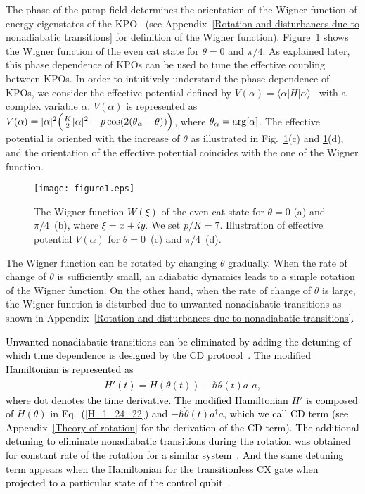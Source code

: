 \documentclass[%
 reprint,
 amsmath,amssymb,
 aps,
pra,
]{revtex4-2}
\begin{document}
The phase of the pump field determines the orientation of the Wigner function of energy eigenstates of the KPO~\cite{Puri2020} (see Appendix~\ref{Rotation and disturbances due to nonadiabatic transitions} for definition of the Wigner function).
Figure~\ref{Wig0_11_25_21} shows the Wigner function of the even cat state for $\theta=0$ and $\pi/4$.
As explained later, this phase dependence of KPOs can be used to tune the effective coupling between KPOs.
In order to intuitively understand the phase dependence of KPOs, we consider the effective potential defined by $V(\alpha)=\langle \alpha | H | \alpha \rangle$~\cite{Zhang2017} with a complex variable $\alpha$.
$V(\alpha)$ is represented as 
$V(\alpha)=|\alpha|^2 \Big{(} \frac{K}{2}|\alpha|^2 - p\cos(2(\theta_\alpha - \theta) ) \Big{)}$, 
where $\theta_\alpha={\rm arg}[\alpha]$.
The effective potential is oriented with the increase of $\theta$ as illustrated in 
Fig.~\ref{Wig0_11_25_21}(c) and \ref{Wig0_11_25_21}(d), and
the orientation of the effective potential coincides with the one of the Wigner function.
\begin{figure}[h!]
\begin{center}
\texttt{[image: figure1.eps]}
\end{center}
\caption{
The Wigner function \textcolor{black}{$W(\xi)$} of the even cat state for $\theta=0$ (a) and $\pi/4$~(b)\textcolor{black}{, where $\xi=x+iy$}.
We set $p/K=7$.
Illustration of effective potential $V(\alpha)$ for $\theta=0$~(c) and $\pi/4$~(d).
}
\label{Wig0_11_25_21}
\end{figure}




The Wigner function can be rotated by changing $\theta$ gradually.
When the rate of change of $\theta$ is sufficiently small, an adiabatic dynamics leads to a simple rotation of the Wigner function.
On the other hand, when the rate of change of $\theta$ is large, the Wigner function is disturbed due to unwanted nonadiabatic transitions as shown in Appendix~\ref{Rotation and disturbances due to nonadiabatic transitions}.

\textcolor{black}{Unwanted nonadiabatic transitions can be eliminated by adding the detuning of which time dependence is designed by the CD protocol~\cite{Rice2003}.
The modified Hamiltonian is represented as
\begin{eqnarray}
H'(t) = H(\theta(t)) - \hbar \dot\theta(t) a^\dagger a,  
\end{eqnarray}
where dot denotes the time derivative.
The modified Hamiltonian $H'$ is composed of $H(\theta)$ in Eq.~(\ref{H_1_24_22}) and $- \hbar \dot\theta(t) a^\dagger a$, which we call CD term (see Appendix~\ref{Theory of rotation} for the derivation of the CD term).
The additional detuning to eliminate nonadiabatic transitions during the rotation was obtained for constant rate of the rotation for a similar system~\cite{Guillaud2019}. And the same detuning term appears when the Hamiltonian for the transitionless CX gate when projected to a particular state of the control qubit~\cite{Puri2020}. }
\end{document}

